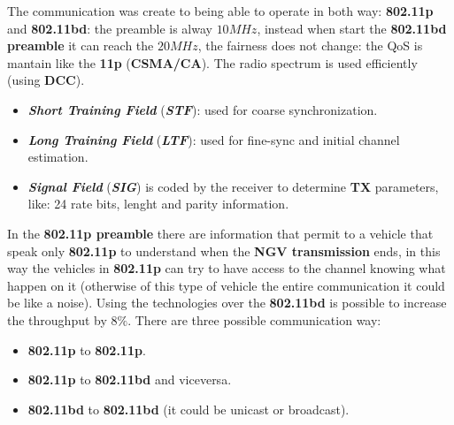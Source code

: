 The communication was create to being able to operate in both way: \textbf{802.11p} and \textbf{802.11bd}: the preamble is alway $10MHz$, instead when start the \textbf{802.11bd preamble} it can reach the $20MHz$, the fairness does not change: the QoS is mantain like the \textbf{11p} (\textbf{CSMA/CA}). The radio spectrum is used efficiently (using \textbf{DCC}).
\begin{itemize}[nosep]
    \item \textbf{\textit{Short Training Field}} (\textbf{\textit{STF}}): used for coarse synchronization.
    \item \textbf{\textit{Long Training Field}} (\textbf{\textit{LTF}}): used for fine-sync and initial channel estimation.
    \item \textbf{\textit{Signal Field}} (\textbf{\textit{SIG}}) is coded by the receiver to determine \textbf{TX} parameters, like: 24 rate bits, lenght and parity information.
\end{itemize}
In the \textbf{802.11p preamble} there are information that permit to a vehicle that speak only \textbf{802.11p} to understand when the \textbf{NGV transmission} ends, in this way the vehicles in \textbf{802.11p} can try to have access to the channel knowing what happen on it (otherwise of this type of vehicle the entire communication it could be like a noise). Using the technologies over the \textbf{802.11bd} is possible to increase the throughput by $8\%$. There are three possible communication way:
\begin{itemize}[nosep]
    \item \textbf{802.11p} to \textbf{802.11p}.
    \item \textbf{802.11p} to \textbf{802.11bd} and viceversa.
    \item \textbf{802.11bd} to \textbf{802.11bd} (it could be unicast or broadcast).
\end{itemize}

